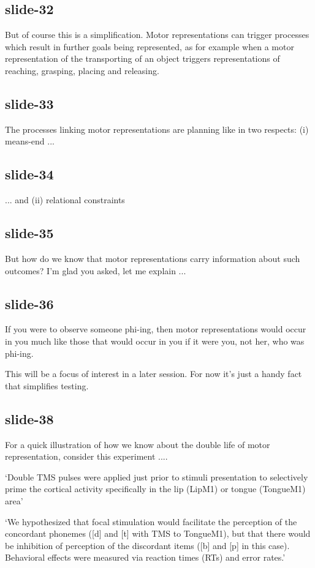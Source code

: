 \documentclass[12pt,\papersize]{extarticle}
\begin{document}
\subsection{slide-32}
But of course this is a simplification. Motor representations can trigger processes
which result in further goals being represented, as for example when a motor
representation of the transporting of an object triggers representations of reaching,
grasping, placing and releasing.
 
\subsection{slide-33}
The processes linking motor representations are planning like in two respects:
(i) means-end ...
 
\subsection{slide-34}
... and (ii) relational constraints
 
\subsection{slide-35}
But how do we know that motor representations carry information about such outcomes?
I’m glad you asked, let me explain ...
 
\subsection{slide-36}
If you were to observe someone phi-ing,
then motor representations would occur in you
much like those that would occur in you if it were you, not her, who was phi-ing.
 
This will be a focus of interest in a later session.
For now it’s just a handy fact that simplifies testing.
 
\subsection{slide-38}
For a quick illustration of how we know about the double life of motor representation, consider
this experiment ....
 
‘Double TMS pulses were applied just prior to stimuli presentation to selectively prime the cortical
activity specifically in the lip (LipM1) or tongue (TongueM1) area’
\citep[p.~381]{dausilio:2009_motor}
 
‘We hypothesized that focal stimulation would facilitate the perception of
the concordant phonemes ([d] and [t] with TMS to TongueM1), but that
there would be inhibition of perception of the discordant items
([b] and [p] in this case). Behavioral effects were measured via reaction
times (RTs) and error rates.’ \citep[p.~382]{dausilio:2009_motor}
 
\end{document}
